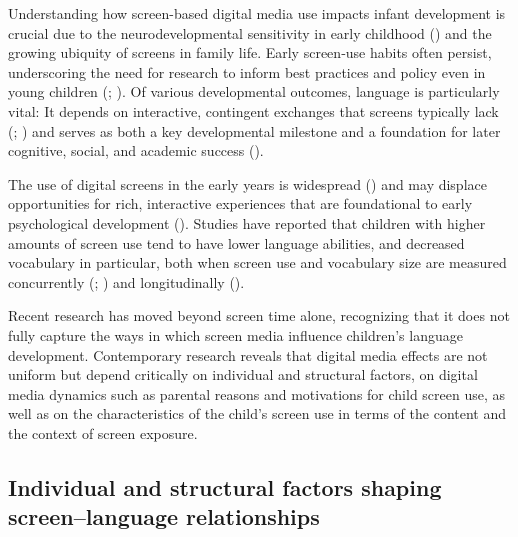\documentclass[
  man,
  floatsintext,
  longtable,
  nolmodern,
  notxfonts,
  notimes,
  colorlinks=true,linkcolor=blue,citecolor=blue,urlcolor=blue]{apa7}
\begin{document}
Understanding how screen-based digital media use impacts infant
development is crucial due to the neurodevelopmental sensitivity in
early childhood
() and
the growing ubiquity of screens in family life. Early screen‐use habits
often persist, underscoring the need for research to inform best
practices and policy even in young children
(;
).
Of various developmental outcomes, language is particularly vital: It
depends on interactive, contingent exchanges that screens typically lack
(;
) and serves as both a key developmental milestone and a foundation
for later cognitive, social, and academic success
().

The use of digital screens in the early years is widespread
() and may
displace opportunities for rich, interactive experiences that are
foundational to early psychological development
(). Studies have reported that children with higher amounts of
screen use tend to have lower language abilities, and decreased
vocabulary in particular, both when screen use and vocabulary size are
measured concurrently (; ) and longitudinally
().

Recent research has moved beyond screen time alone, recognizing that it
does not fully capture the ways in which screen media influence
children's language development. Contemporary research reveals that
digital media effects are not uniform but depend critically on
individual and structural factors, on digital media dynamics such as
parental reasons and motivations for child screen use, as well as on the
characteristics of the child's screen use in terms of the content and
the context of screen exposure.

\subsection{Individual and structural factors shaping screen--language
relationships}\label{individual-and-structural-factors-shaping-screenlanguage-relationships}
\end{document}
